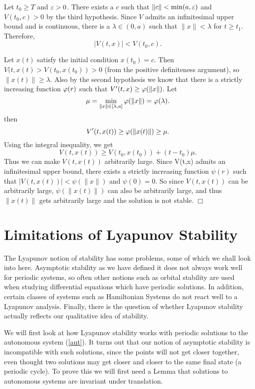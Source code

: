 \documentclass[nols]{tufte-handout}
\theoremstyle{definition}
\begin{document}
Let $t_0 \ge T$ and $\varepsilon > 0$.  There exists a $c$ such that $\| c \|
< \min(a,\varepsilon)$ and $V(t_0,c) > 0$ by the third hypothesis.  Since $V$
admits an infinitesimal upper bound and is continuous, there is a
$\lambda \in (0,a)$ such that $\| x \| < \lambda$ for $t \ge t_1$.
Therefore,
$$| V(t,x) | < V(t_0, c).$$

Let $x(t)$ satisfy the initial condition $x(t_0) = c$.  Then $V(t,x(t)
> V(t_0, x(t_0)) > 0$ (from the positive definiteness argument), so
$\| x(t) \| \ge \lambda$.  Also by the second hypothesis we know that
there is a strictly increasing function $\varphi(r)$ such that $V'(t,x)
\ge \varphi(\| x \|)$.  Let
$$ \mu = \min_{\| x \| \in [\lambda, a]} \varphi(\| x \|) = \varphi (\lambda).$$
then
$$V'(t,x(t)) \ge \varphi(\| x(t) \|) \ge \mu.$$
Using the integral inequality, we get
$$V(t,x(t)) \ge V(t_0, x(t_0)) + (t - t_0) \mu.$$ Thus we can make
$V(t, x(t))$ arbitrarily large.  Since V(t,x) admits an infinitesimal
upper bound, there exists a strictly increasing function $\psi (r)$
such that $|V(t,x(t))| < \psi (\| x \|)$ and $\psi (0) = 0$.  So since
$V(t,x(t))$ can be arbitrarily large, $\psi(\| x(t) \|)$ can also be
arbitrarily large, and thus $\| x(t) \|$ gets arbitrarily large and the
solution is not stable. $\Box$

\section {Limitations of Lyapunov Stability}

The Lyapunov notion of stability has some problems, some of which we
shall look into here.  Asymptotic stability as we have defined it does
not always work well for periodic systems, so often other notions such
as orbital stability are used when studying differential equations
which have periodic solutions.  In addition, certain classes of
systems such as Hamiltonian Systems do not react well to a Lyapunov
analysis.  Finally, there is the question of whether Lyapunov
stability actually reflects our qualitative idea of stability.

We will first look at how Lyapunov stability works with periodic
solutions to the autonomous system (\ref{aut}).  It turns out that our
notion of asymptotic stability is incompatible with such solutions,
since the points will not get closer together, even thought two
solutions may get closer and closer to the same final state (a
periodic cycle).  To prove this we will first need a Lemma that
solutions to autonomous systems are invariant under translation.
\end{document}
